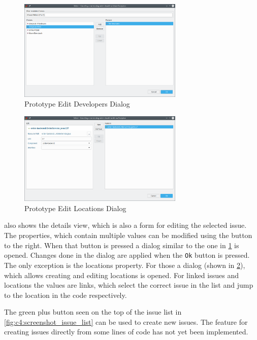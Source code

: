 \begin{figure}[!h]
	\centering
	\includegraphics[width=0.7\textwidth]{graphics/screenshot_gropius_ei_edit_list.png}
	\caption{Prototype Edit Developers Dialog}
	\label{fig:c4:screenshot_edit_list}
\end{figure}

\begin{figure}[!h]
	\centering
	\includegraphics[width=0.7\textwidth]{graphics/screenshot_gropius_ei_edit_locations.png}
	\caption{Prototype Edit Locations Dialog}
	\label{fig:c4:screenshot_edit_locations}
\end{figure}

 also shows the details view, which is also a form for editing the selected issue.
The properties, which contain multiple values can be modified using the button to the right.
When that button is pressed a dialog similar to the one in \cref{fig:c4:screenshot_edit_list} is opened.
Changes done in the dialog are applied when the \lstinline|Ok| button is pressed.
The only exception is the locations property.
For those a dialog (shown in \cref{fig:c4:screenshot_edit_locations}), which allows creating and editing locations is opened.
For linked issues and locations the values are links, 
which select the correct issue in the list and jump to the location in the code respectively.

The green plus button seen on the top of the issue list in \cref{fig:c4:screenshot_issue_list} can be used to create new issues.
The feature for creating issues directly from some lines of code has not yet been implemented.





